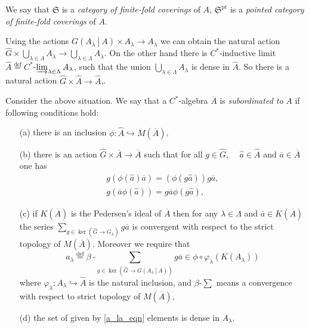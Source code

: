 \documentclass{beamer}
\theoremstyle{plain}
\newcommand{\be}{\begin{equation}}
\newcommand{\ee}{\end{equation}}
\newcommand{\la}{\lambda}
\newcommand{\La}{\Lambda}
\newcommand{\bt}{\beta}           %
\newcommand{\bydef}{\stackrel{\mathrm{def}}{=}}
\newcommand{\hookto}{\hookrightarrow}        %
\begin{document}
\begin{frame}
	\begin{definition}
		We say that $\mathfrak{S}$ is a \textit{category of finite-fold coverings} of $A$, $\mathfrak{S}^{\text{pt}}$ is a \textit{pointed category of finite-fold coverings} of $A$.
	\end{definition}
Using the actions  $G\left(\left.A_\la~\right|~A\right)\times A_\la \to A_\la$ we can obtain  the natural action $\widehat{G}\times \bigcup_{\la\in \La} A_\la \to  \bigcup_{\la\in \La} A_\la$. On the other hand there is $C^*$-inductive limit $\widehat A \bydef C^*$-$\varinjlim_{\la\in \La} A_\la$, such that the union $\bigcup_{\la\in \La} A_\la$ is dense in $\widehat A$. So there is a natural action $\widehat{G} \times \widehat{A}\to \widehat{A}$,.
\end{frame}
\begin{frame}
	Consider the above situation.  We say that a $C^*$-algebra $\overline A$ is \textit{ subordinated to}  $A$ if following conditions hold:
	\begin{enumerate}
		\item [(a)] there is an inclusion $\phi: \widehat A \hookto M\left(\overline A\right)$,
		\item[(b)] there is an action $\widehat{G}\times \overline A \to \overline A$ such that
		for all $g \in \widehat{G}$,  $\quad \widehat a \in \widehat{A}$ and $\overline a \in \overline{A}$ one has
		\be\label{subord_ga_eqn}
		\begin{split}
			g\left(\phi\left(\widehat a \right)\overline{a}\right)  = 	\left(\phi\left(g\widehat a \right)\right) g \overline{a},\\
			g\left( \overline{a}\phi\left(\widehat a \right)\right) =g \overline{a}\phi\left(g\widehat a \right),
		\end{split}
		\ee
		\item[(c)] if $K\left( \overline{A}\right)$ is the Pedersen's ideal of $\overline A$ then   for any $\la\in \La$  and $\overline a \in K\left( \overline{A}\right)$ the series $\sum_{g \in \ker\left(\widehat{G}\to G_\la\right)}g \overline a$ is convergent with respect to the strict topology of $M\left(\overline{A} \right)$. Moreover we require that
		\be\label{a_la_eqn}
		a_\la \bydef 	\bt~\text{-}\sum_{g \in \ker\left(\widehat{G}\to G\left(\left.A_\la~\right|~A\right)\right)}g \overline a \in \phi\circ \varphi_\la\left( K\left( A_\la\right) \right) 	
		\ee
		where $\varphi_\la : A_\la \hookto \widehat A$ is the natural inclusion, and $\bt$-$\sum$ means a convergence with respect to strict topology of $M\left( \overline A\right)$,
		\item[(d)] the set of given by \eqref{a_la_eqn} elements is dense in $A_\la$.
	\end{enumerate}

\end{frame}
\end{document}
